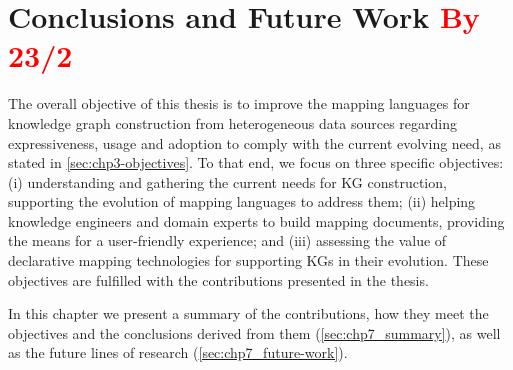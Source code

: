 \chapter{Conclusions and Future Work \textcolor{red}{By 23/2}}
\label{chapter:conclusions}

%

The overall objective of this thesis is to improve the mapping languages for knowledge graph construction from heterogeneous data sources regarding expressiveness, usage and adoption to comply with the current evolving need, as stated in \cref{sec:chp3-objectives}. To that end, we focus on three specific objectives: (i) understanding and gathering the current needs for KG construction, supporting the evolution of mapping languages to address them; (ii) helping knowledge engineers and domain experts to build mapping documents, providing the means for a user-friendly experience; and (iii) assessing the value of declarative mapping technologies for supporting KGs in their evolution. These objectives are fulfilled with the contributions presented in the thesis.

In this chapter we present a summary of the contributions, how they meet the objectives and the conclusions derived from them (\cref{sec:chp7_summary}), as well as the future lines of research (\cref{sec:chp7_future-work}). 

